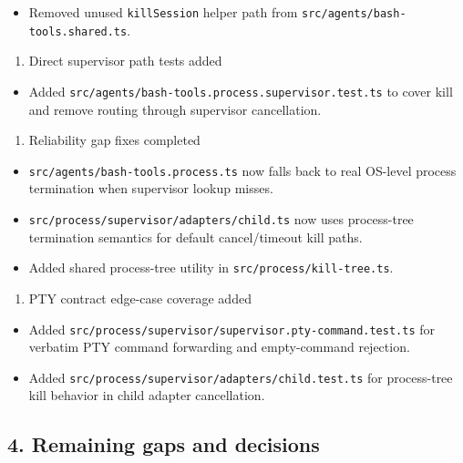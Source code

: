 \begin{itemize}
  \item Removed unused \texttt{killSession} helper path from \texttt{src/agents/bash-tools.shared.ts}.
\end{itemize}


\begin{enumerate}
  \item Direct supervisor path tests added
\end{enumerate}


\begin{itemize}
  \item Added \texttt{src/agents/bash-tools.process.supervisor.test.ts} to cover kill and remove routing through supervisor cancellation.
\end{itemize}


\begin{enumerate}
  \item Reliability gap fixes completed
\end{enumerate}


\begin{itemize}
  \item \texttt{src/agents/bash-tools.process.ts} now falls back to real OS-level process termination when supervisor lookup misses.
  \item \texttt{src/process/supervisor/adapters/child.ts} now uses process-tree termination semantics for default cancel/timeout kill paths.
  \item Added shared process-tree utility in \texttt{src/process/kill-tree.ts}.
\end{itemize}


\begin{enumerate}
  \item PTY contract edge-case coverage added
\end{enumerate}


\begin{itemize}
  \item Added \texttt{src/process/supervisor/supervisor.pty-command.test.ts} for verbatim PTY command forwarding and empty-command rejection.
  \item Added \texttt{src/process/supervisor/adapters/child.test.ts} for process-tree kill behavior in child adapter cancellation.
\end{itemize}


\subsection{4. Remaining gaps and decisions}


